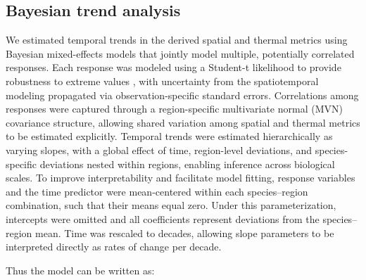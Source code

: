 \documentclass[pdflatex,sn-nature,referee]{sn-jnl}%
\begin{document}
\newpage

\subsection{Bayesian trend analysis}\label{sec:Bayesian trend analysis}

We estimated temporal trends in the derived spatial and thermal metrics using Bayesian mixed-effects models that jointly model multiple, potentially correlated responses. Each response was modeled using a Student-t likelihood to provide robustness to extreme values \citep[e.g.,][]{anderson_black-swan_2017}, with uncertainty from the spatiotemporal modeling propagated via observation-specific standard errors. Correlations among responses were captured through a region-specific multivariate normal (MVN) covariance structure, allowing shared variation among spatial and thermal metrics to be estimated explicitly. Temporal trends were estimated hierarchically as varying slopes, with a global effect of time, region-level deviations, and species-specific deviations nested within regions, enabling inference across biological scales. To improve interpretability and facilitate model fitting, response variables and the time predictor were mean-centered within each species–region combination, such that their means equal zero. Under this parameterization, intercepts were omitted and all coefficients represent deviations from the species–region mean. Time was rescaled to decades, allowing slope parameters to be interpreted directly as rates of change per decade.

Thus the model can be written as:
\end{document}
